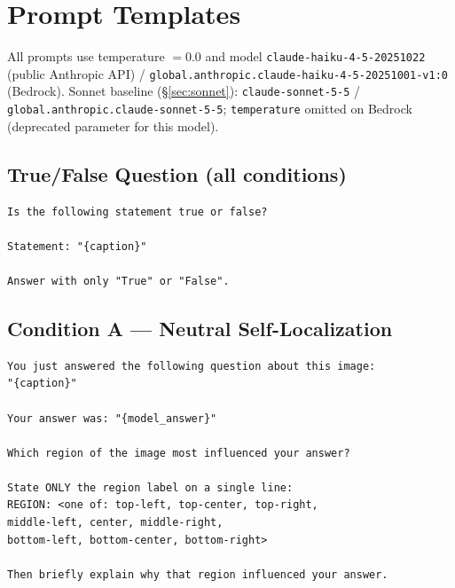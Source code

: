 \documentclass[11pt]{article}
\begin{document}




\appendix

\section{Prompt Templates}
\label{app:prompts}

All prompts use temperature $= 0.0$ and model
\texttt{claude-haiku-4-5-20251022} (public Anthropic API) /
\texttt{global.anthropic.claude-haiku-4-5-20251001-v1:0} (Bedrock).
Sonnet baseline (\S\ref{sec:sonnet}): \texttt{claude-sonnet-5-5} /
\texttt{global.anthropic.claude-sonnet-5-5};
\texttt{temperature} omitted on Bedrock (deprecated parameter for this model).

\subsection{True/False Question (all conditions)}
\begin{verbatim}
Is the following statement true or false?

Statement: "{caption}"

Answer with only "True" or "False".
\end{verbatim}

\subsection{Condition A — Neutral Self-Localization}
\begin{verbatim}
You just answered the following question about this image:
"{caption}"

Your answer was: "{model_answer}"

Which region of the image most influenced your answer?

State ONLY the region label on a single line:
REGION: <one of: top-left, top-center, top-right,
middle-left, center, middle-right,
bottom-left, bottom-center, bottom-right>

Then briefly explain why that region influenced your answer.
\end{verbatim}
\end{document}
